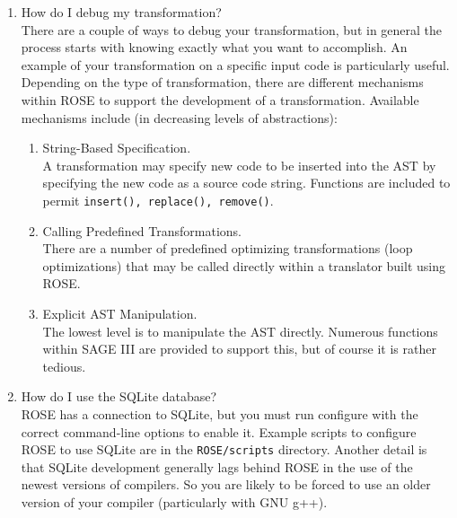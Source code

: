 \begin{enumerate}
\item How do I debug my transformation? \\
   There are a couple of ways to debug your transformation, but in general
the process starts with knowing exactly what you want to accomplish.
An example of your transformation on a specific input code is particularly useful.
Depending on the type of transformation, there are different mechanisms within 
ROSE to support the development of a transformation.  Available mechanisms
include (in decreasing levels of abstractions):
\begin{enumerate}
   \item String-Based Specification. \\
      A transformation may specify new code to be inserted into the AST
      by specifying the new code as a source code string.  Functions are
      included to permit {\tt insert(), replace(), remove()}.
   \item Calling Predefined Transformations. \\
      There are a number of predefined optimizing transformations (loop optimizations) 
      that may be called directly within a translator built using ROSE.
   \item Explicit AST Manipulation. \\
      The lowest level is to manipulate the AST directly.  Numerous functions
      within SAGE III are provided to support this, but of course it is rather 
      tedious.
\end{enumerate}


\item How do I use the SQLite database? \\
   ROSE has a connection to SQLite, but you must run configure with the
correct command-line options to enable it.  Example scripts to configure
ROSE to use SQLite are in the {\tt ROSE/scripts} directory. Another detail 
is that SQLite development generally lags behind ROSE in the use of the newest 
versions of compilers. So you are likely to be forced to use an older 
version of your compiler (particularly with GNU g++).


\end{enumerate}
